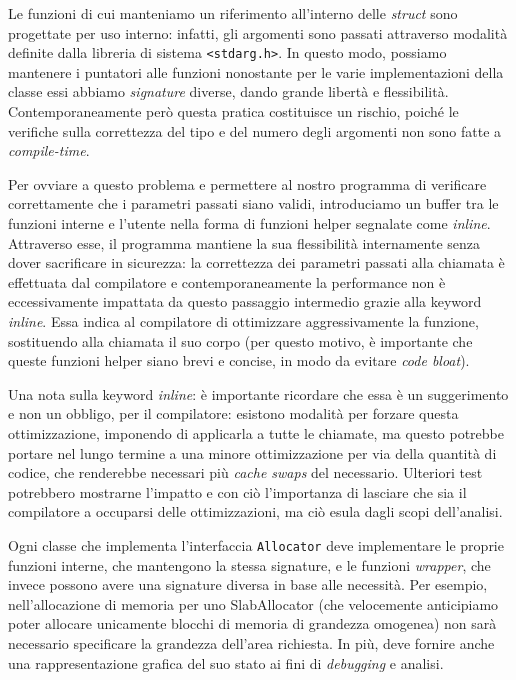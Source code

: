 Le funzioni di cui manteniamo un riferimento all'interno delle \textit{struct} sono progettate per uso interno: infatti, gli argomenti sono passati attraverso modalità definite dalla libreria di sistema \texttt{<stdarg.h>}. In questo modo, possiamo mantenere i puntatori alle funzioni nonostante per le varie implementazioni della classe essi abbiamo \textit{signature} diverse, dando grande libertà e flessibilità. Contemporaneamente però questa pratica costituisce un rischio, poiché le verifiche sulla correttezza del tipo e del numero degli argomenti non sono fatte a \textit{compile-time}.

Per ovviare a questo problema e permettere al nostro programma di verificare correttamente che i parametri passati siano validi, introduciamo un buffer tra le funzioni interne e l’utente nella forma di funzioni helper segnalate come \textit{inline}. Attraverso esse, il programma mantiene la sua flessibilità internamente senza dover sacrificare in sicurezza: la correttezza dei parametri passati alla chiamata è effettuata dal compilatore e contemporaneamente la performance non è eccessivamente impattata da questo passaggio intermedio grazie alla keyword \textit{inline}. Essa indica al compilatore di ottimizzare aggressivamente la funzione, sostituendo alla chiamata il suo corpo (per questo motivo, è importante che queste funzioni helper siano brevi e concise, in modo da evitare \textit{code bloat}).

Una nota sulla keyword \textit{inline}: è importante ricordare che essa è un suggerimento e non un obbligo, per il compilatore: esistono modalità per forzare questa ottimizzazione, imponendo di applicarla a tutte le chiamate, ma questo potrebbe portare nel lungo termine a una minore ottimizzazione per via della quantità di codice, che renderebbe necessari più \textit{cache swaps} del necessario. Ulteriori test potrebbero mostrarne l’impatto e con ciò l’importanza di lasciare che sia il compilatore a occuparsi delle ottimizzazioni, ma ciò esula dagli scopi dell’analisi.

Ogni classe che implementa l’interfaccia \texttt{Allocator} deve implementare le proprie funzioni interne, che mantengono la stessa signature, e le funzioni \textit{wrapper}, che invece possono avere una signature diversa in base alle necessità. Per esempio, nell’allocazione di memoria per uno SlabAllocator (che velocemente anticipiamo poter allocare unicamente blocchi di memoria di grandezza omogenea) non sarà necessario specificare la grandezza dell’area richiesta. In più, deve fornire anche una rappresentazione grafica del suo stato ai fini di \textit{debugging} e analisi.

